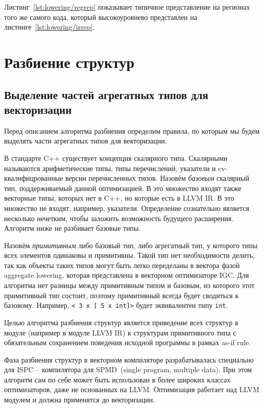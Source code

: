 Листинг~\cref{lst:lowering/regrep} показывает типичное представление на регионах того же самого кода, который высокоуровнево представлен на листинге~\cref{lst:lowering/irrep}.

\section{Разбиение структур}\label{sec:lowering/splitter}

\subsection{Выделение частей агрегатных типов для векторизации}\label{subsec:lowering/splitter/vectorization}

Перед описанием алгоритма разбиения определим правила, по которым мы будем выделять части агрегатных типов для векторизации.

В стандарте C++ существует концепция скалярного типа. Скалярными называются арифметические типы, типы перечислений, указатели и cv-квалифицрованные версии перечисленных типов. Назовём \emph{базовым} скалярный тип, поддерживаемый данной оптимизацией. В это множество входят также векторные типы, которых нет в C++, но которые есть в LLVM IR.  В это множество не входят, например, указатели. Определение сознательно является несколько нечетким, чтобы заложить возможность будущего расширения. Алгоритм ниже не разбивает базовые типы.

Назовём \emph{примитивным} либо базовый тип, либо агрегатный тип, у которого типы всех элементов одинаковы и примитивны. Такой тип нет необходимости делить, так как объекты таких типов могут быть легко переделаны в вектора фазой aggregate lowering, которая представлена в векторном оптимизаторе IGC. Для алгоритма нет разницы между примитивным типом и базовым, из которого этот примитивный тип состоит, поэтому примитивный всегда будет сводиться к базовому. Например, \verb|< 3 x [ 5 x int]>| будет эквивалентен типу \verb|int|.

Целью алгоритма разбиения структур является приведение всех структур в модуле (например в модуле LLVM IR) к структурам примитивного типа с обязательным сохранением поведения исходной программы в рамках as-if rule.

Фаза разбиения структур в векторном компиляторе разрабатывалась специально для ISPC -- компилятора для SPMD~(single program, multiple data). При этом алгоритм сам по себе может быть использован в более широких классах оптимизаторов, даже не основанных на LLVM. Оптимизация работает над LLVM модулем и должна применятся до векторизации.


